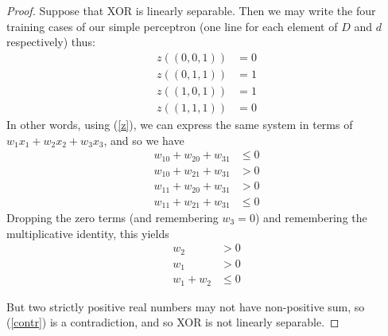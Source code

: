 \documentclass[12 pt]{report}
\begin{document}
\begin{proof}
  Suppose that XOR is linearly separable.  Then we may write the four
  training cases of our simple perceptron (one line for each element of
  $D$ and $d$ respectively) thus:
  \begin{align*}
    z((0,0,1)) & = 0 \\
    z((0,1,1)) & = 1 \\
    z((1,0,1)) & = 1 \\
    z((1,1,1)) & = 0
  \end{align*}
  In other words, using (\ref{z}), we can express the same system in
  terms of $w_1x_1 + w_2x_2 + w_3x_3$, and so we have
  \begin{align*}
    w_10 + w_20 + w_31 & \le 0 \\
    w_10 + w_21 + w_31  & > 0 \\
    w_11 + w_20 + w_31  & > 0 \\
    w_11 + w_21 + w_31  & \le 0
  \end{align*}
  Dropping the zero terms (and remembering $w_3=0$) and remembering
  the multiplicative identity, this yields
  \begin{align}
    \label{contr}
    w_2  & > 0 \nonumber \\
    w_1   & > 0 \nonumber \\
  w_1 + w_2  & \le 0
\end{align}

But two strictly positive real numbers may not have non-positive sum,
so (\ref{contr}) is a contradiction, and so XOR is not linearly
separable.

\end{proof}
\end{document}
